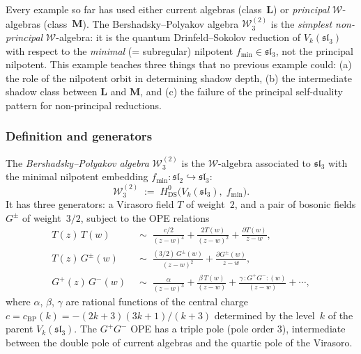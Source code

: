 Every example so far has used either current algebras (class~$\mathbf{L}$)
or \emph{principal} $\mathcal{W}$-algebras (class~$\mathbf{M}$). The
Bershadsky--Polyakov algebra $\mathcal{W}_3^{(2)}$ is the
\emph{simplest non-principal} $\mathcal{W}$-algebra: it is the quantum
Drinfeld--Sokolov reduction of $V_k(\mathfrak{sl}_3)$ with respect to the
\emph{minimal} (= subregular) nilpotent $f_{\min} \in \mathfrak{sl}_3$,
not the principal nilpotent. This example teaches three things that
no previous example could: (a) the role of the nilpotent orbit in
determining shadow depth, (b) the intermediate shadow class between
$\mathbf{L}$ and $\mathbf{M}$, and (c) the failure of the principal
self-duality pattern for non-principal reductions.

\subsubsection{Definition and generators}

\begin{definition}
\label{def:bershadsky-polyakov}
The \emph{Bershadsky--Polyakov algebra}
$\mathcal{W}_3^{(2)}$ is the $\mathcal{W}$-algebra associated to
$\mathfrak{sl}_3$ with the minimal nilpotent embedding
$f_{\min}\colon \mathfrak{sl}_2 \hookrightarrow \mathfrak{sl}_3$:
\[
 \mathcal{W}_3^{(2)}
 \;:=\;
 H^0_{\mathrm{DS}}\bigl(V_k(\mathfrak{sl}_3),\; f_{\min}\bigr).
\]
It has three generators: a Virasoro field $T$ of weight~$2$,
and a pair of bosonic fields $G^\pm$ of weight~$3/2$, subject
to the OPE relations
\begin{align}
 T(z)\,T(w) &\;\sim\; \frac{c/2}{(z-w)^4}
 + \frac{2T(w)}{(z-w)^2} + \frac{\partial T(w)}{z-w},
 \label{eq:BP-TT} \\
 T(z)\,G^\pm(w) &\;\sim\; \frac{(3/2)\,G^\pm(w)}{(z-w)^2}
 + \frac{\partial G^\pm(w)}{z-w},
 \label{eq:BP-TG} \\
 G^+(z)\,G^-(w) &\;\sim\;
 \frac{\alpha}{(z-w)^3}
 + \frac{\beta\, T(w)}{(z-w)}
 + \frac{\gamma\, {:}G^+G^-{:}(w)}{(z-w)}
 + \cdots, \label{eq:BP-GG}
\end{align}
where $\alpha$, $\beta$, $\gamma$ are rational functions of the
central charge
$c = c_{\mathrm{BP}}(k) = -(2k+3)(3k+1)/(k+3)$ determined by the level~$k$ of the
parent $V_k(\mathfrak{sl}_3)$.
The $G^+G^-$ OPE has a triple pole
\textup{(}pole order $3$\textup{)}, intermediate between the
double pole of current algebras and the quartic pole of the Virasoro.
\end{definition}

